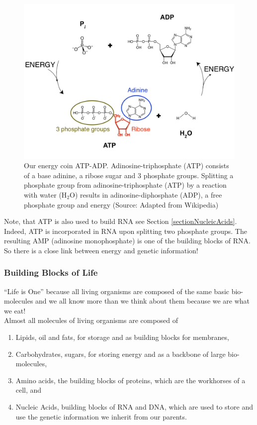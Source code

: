 \documentclass[
  11pt,
]{book}
\providecommand{\tightlist}{%
  \setlength{\itemsep}{0pt}\setlength{\parskip}{0pt}}
\begin{document}
\begin{figure}

{\centering \includegraphics[width=0.7\linewidth]{./figs/ATP-ADP} 

}

\caption{Our energy coin ATP-ADP. Adinosine-triphosphate (ATP) consists of a base adinine, a ribose sugar and 3 phosphate groups. Splitting a phosphate group from adinosine-triphosphate (ATP) by a reaction with water (H\(_2\)O) results in adinosine-diphosphate (ADP), a free phosphate group and energy (Source: Adapted from Wikipedia)}\label{fig:atp-adp}
\end{figure}

Note, that ATP is also used to build RNA see Section \ref{sectionNucleicAcids}. Indeed, ATP is incorporated in RNA upon splitting two phosphate groups. The resulting AMP (adinosine monophosphate) is one of the building blocks of RNA. So there is a close link between energy and genetic information!

\hypertarget{building-blocks-of-life}{%
\subsubsection{Building Blocks of Life}\label{building-blocks-of-life}}

``Life is One'' because all living organisms are composed of the same basic bio-molecules and we all know more than we think about them because we are what we eat!\\
Almost all molecules of living organisms are composed of

\begin{enumerate}
\def\labelenumi{\arabic{enumi}.}
\tightlist
\item
  Lipids, oil and fats, for storage and as building blocks for membranes,
\item
  Carbohydrates, sugars, for storing energy and as a backbone of large bio-molecules,
\item
  Amino acids, the building blocks of proteins, which are the workhorses of a cell, and
\item
  Nucleic Acids, building blocks of RNA and DNA, which are used to store and use the genetic information we inherit from our parents.
\end{enumerate}
\end{document}
